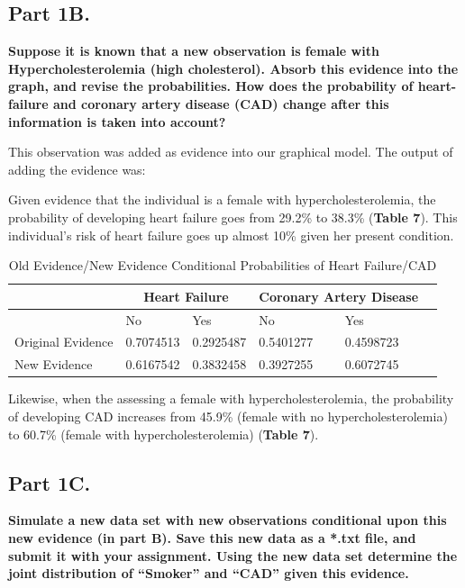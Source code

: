 \documentclass[]{article}
\begin{document}
\subsection{Part 1B.}\label{part-1b.}

\textbf{Suppose it is known that a new observation is female with
Hypercholesterolemia (high cholesterol). Absorb this evidence into the
graph, and revise the probabilities. How does the probability of
heart-failure and coronary artery disease (CAD) change after this
information is taken into account?}

This observation was added as evidence into our graphical model. The
output of adding the evidence was:

Given evidence that the individual is a female with
hypercholesterolemia, the probability of developing heart failure goes
from 29.2\% to 38.3\% (\textbf{Table 7}). This individual's risk of
heart failure goes up almost 10\% given her present condition.

\begin{table}[]
\centering
\begin{tabular}{|l|l|l|l|l|l|}
\hline
& \multicolumn{2}{|c|}{Heart Failure} & \multicolumn{2}{|c|}{Coronary Artery Disease} \\ \hline    
                  & No        & Yes        & No          & Yes \\ \hline
Original Evidence & 0.7074513 & 0.2925487  & 0.5401277   & 0.4598723 \\ \hline
New Evidence      & 0.6167542 & 0.3832458  & 0.3927255   & 0.6072745 \\ \hline
\end{tabular}
\caption{Old Evidence/New Evidence Conditional Probabilities of Heart Failure/CAD}
\label{my-label}
\end{table}

Likewise, when the assessing a female with hypercholesterolemia, the
probability of developing CAD increases from 45.9\% (female with no
hypercholesterolemia) to 60.7\% (female with hypercholesterolemia)
(\textbf{Table 7}).

\clearpage

\subsection{Part 1C.}\label{part-1c.}

\textbf{Simulate a new data set with new observations conditional upon this new evidence (in part B). Save this new data as a *.txt file, and submit it with your assignment. Using the new data set determine the joint distribution of “Smoker” and “CAD” given this evidence.}
\end{document}
